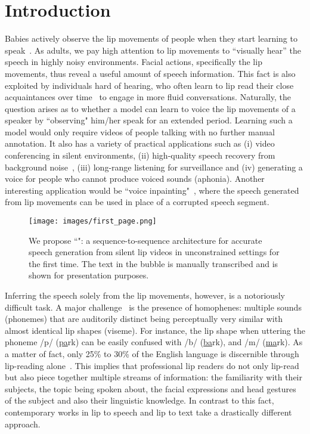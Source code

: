 \documentclass[10pt,twocolumn,letterpaper]{article}
\begin{document}
\section{Introduction}
\label{section:intro}
Babies actively observe the lip movements of people when they start learning to speak~\cite{lewkowicz2012infants}. As adults, we pay high attention to lip movements to ``visually hear'' the speech in highly noisy environments. Facial actions, specifically the lip movements, thus reveal a useful amount of speech information. This fact is also exploited by individuals hard of hearing, who often learn to lip read their close acquaintances over time~\cite{iezzoni2004communicating} to engage in more fluid conversations. Naturally, the question arises as to whether a model can learn to voice the lip movements of a speaker by ``observing" him/her speak for an extended period. Learning such a model would only require videos of people talking with no further manual annotation. It also has a variety of practical applications such as (i) video conferencing in silent environments, (ii) high-quality speech recovery from background noise~\cite{afouras2018conversation}, (iii) long-range listening for surveillance and (iv) generating a voice for people who cannot produce voiced sounds (aphonia). Another interesting application would be ``voice inpainting"~\cite{zhou2019vision}, where the speech generated from lip movements can be used in place of a corrupted speech segment.

\begin{figure}[t]
  \texttt{[image: images/first\_page.png]}
  \caption{We propose ``\modelnamewithoutspace": a sequence-to-sequence architecture for accurate speech generation from silent lip videos in unconstrained settings for the first time. The text in the bubble is manually transcribed and is shown for presentation purposes.}
  \label{fig:firstpage}
\end{figure}

Inferring the speech solely from the lip movements, however, is a notoriously difficult task. A major challenge~\cite{ephrat2017vid2speech,chung2017lip} is the presence of homophenes: multiple sounds (phonemes) that are auditorily distinct being perceptually very similar with almost identical lip shapes (viseme). For instance, the lip shape when uttering the phoneme /p/ (\underline{pa}rk) can be easily confused with /b/ (\underline{ba}rk), and /m/ (\underline{ma}rk). As a matter of fact, only 25\% to 30\% of the English language is discernible through lip-reading alone~\cite{lieu2007communication,ebert1995communication,margellos2005developing,iezzoni2004communicating}. This implies that professional lip readers do not only lip-read but also piece together multiple streams of information: the familiarity with their subjects, the topic being spoken about, the facial expressions and head gestures of the subject and also their linguistic knowledge. In contrast to this fact, contemporary works in lip to speech and lip to text take a drastically different approach. 
\end{document}

